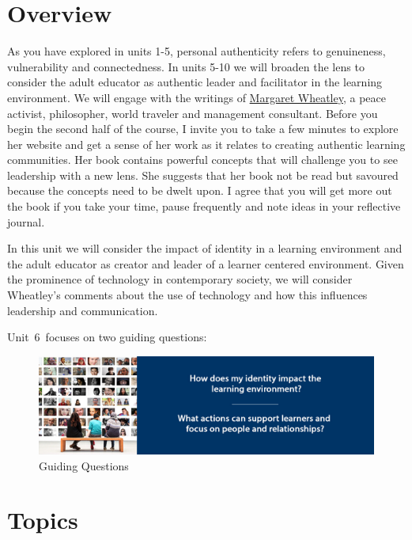 \documentclass[
]{book}
\begin{document}
\hypertarget{overview-5}{%
\section*{Overview}\label{overview-5}}

As you have explored in units 1-5, personal authenticity refers to genuineness, vulnerability and connectedness. In units 5-10 we will broaden the lens to consider the adult educator as authentic leader and facilitator in the learning environment. We will engage with the writings of \href{http://margaretwheatley.com/home/}{Margaret Wheatley}, a peace activist, philosopher, world traveler and management consultant. Before you begin the second half of the course, I invite you to take a few minutes to explore her website and get a sense of her work as it relates to creating authentic learning communities. Her book contains powerful concepts that will challenge you to see leadership with a new lens. She suggests that her book not be read but savoured because the concepts need to be dwelt upon. I agree that you will get more out the book if you take your time, pause frequently and note ideas in your reflective journal.

In this unit we will consider the impact of identity in a learning environment and the adult educator as creator and leader of a learner centered environment. Given the prominence of technology in contemporary society, we will consider Wheatley's comments about the use of technology and how this influences leadership and communication.

Unit~6~focuses on two guiding questions:

\begin{figure}
\centering
\includegraphics{assets/unit6/LDRS664-BannerUnit6.jpg}
\caption{Guiding Questions}
\end{figure}

\hypertarget{topics-5}{%
\section*{Topics}\label{topics-5}}
\end{document}

